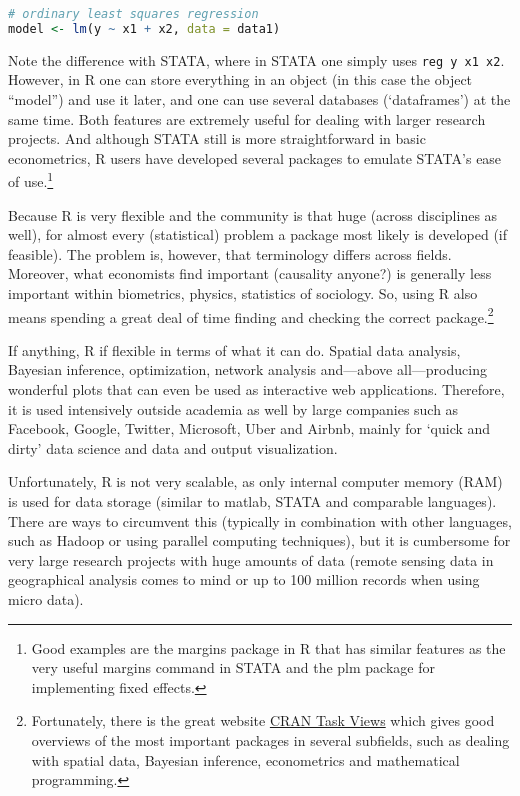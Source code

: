 \documentclass[fleqn,10pt]{SelfArx} %
\begin{document}
\begin{lstlisting}[language=R]
# ordinary least squares regression
model <- lm(y ~ x1 + x2, data = data1)
\end{lstlisting}
Note the difference with STATA, where in STATA one simply uses \texttt{reg y x1 x2}. However, in R one can store everything in an object (in this case the object ``model'') and use it later, and one can use several databases (`dataframes') at the same time. Both features are extremely useful for dealing with larger research projects. And although STATA still is more straightforward in basic econometrics, R users have developed several packages to emulate STATA's ease of use.\footnote{Good examples are the margins package in R that has similar features as the very useful margins command in STATA and the plm package for implementing fixed effects.}

Because R is very flexible and the community is that huge (across disciplines as well), for almost every (statistical) problem a package most likely is developed (if feasible). The problem is, however, that terminology differs across fields. Moreover, what economists find important (causality anyone?) is generally less important within biometrics, physics, statistics of sociology. So, using R also means spending a great deal of time finding and checking the correct package.\footnote{Fortunately, there is the great website \href{https://cran.r-project.org/web/views/}{CRAN Task Views} which gives good overviews of the most important packages in several subfields, such as dealing with spatial data, Bayesian inference, econometrics and mathematical programming.}

If anything, R if flexible in terms of what it can do. Spatial data analysis, Bayesian inference, optimization, network analysis and---above all---producing wonderful plots that can even be used as interactive web applications. Therefore, it is used intensively outside academia as well by large companies such as Facebook, Google, Twitter, Microsoft, Uber and Airbnb, mainly for `quick and dirty' data science and data and output visualization.

Unfortunately, R is not very scalable, as only internal computer memory (RAM) is used for data storage (similar to matlab, STATA and comparable languages). There are ways to circumvent this (typically in combination with other languages, such as Hadoop or using parallel computing techniques), but it is cumbersome for very large research projects with huge amounts of data (remote sensing data in geographical analysis comes to mind or up to 100 million records when using micro data).
\end{document}
